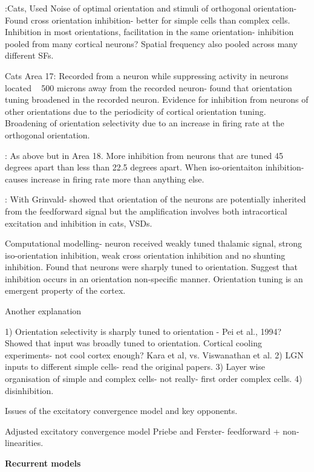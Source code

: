 \documentclass {report}
\begin{document}
\cite{Morrone1982}:Cats, Used Noise of optimal orientation and stimuli of orthogonal orientation- Found cross orientation inhibition- better for simple cells than complex cells. Inhibition in most orientations, facilitation in the same orientation- inhibition pooled from many cortical neurons? Spatial frequency also pooled across many different SFs.

\cite{Worgotter1988, Eysel1990} Cats Area 17: Recorded from a neuron while suppressing activity in neurons located ~ 500 microns away from the recorded neuron- found that orientation tuning broadened in the recorded neuron. Evidence for inhibition from neurons of other orientations due to the periodicity of cortical orientation tuning. Broadening of orientation selectivity due to an increase in firing rate at the orthogonal orientation. 

\cite{Crook1992}: As above but in Area 18. More inhibition from neurons that are tuned 45 degrees apart than less than 22.5 degrees apart. When iso-orientaiton inhibition- causes increase in firing rate more than anything else.

\cite{Sharon2002}: With Grinvald- showed that orientation of the neurons are potentially inherited from the feedforward signal but the amplification involves both intracortical excitation and inhibition in cats, VSDs.

\cite{Somers1995} Computational modelling- neuron received weakly tuned thalamic signal, strong iso-orientation inhibition, weak cross orientation inhibition and no shunting inhibition. Found that neurons were sharply tuned to orientation. Suggest that inhibition occurs in an orientation non-specific manner. Orientation tuning is an emergent property of the cortex.

Another explanation

1) Orientation selectivity is sharply tuned to orientation - Pei et al., 1994? Showed that input was broadly tuned to orientation. Cortical cooling experiments- not cool cortex enough? Kara et al, vs. Viswanathan et al.
2) LGN inputs to different simple cells- read the original papers.
3) Layer wise organisation of simple and complex cells- not really- first order complex cells.
4) disinhibition.

Issues of the excitatory convergence model and key opponents.

Adjusted excitatory convergence model
Priebe and Ferster- feedforward + non-linearities.


\textbf{Recurrent models}
\end{document}
